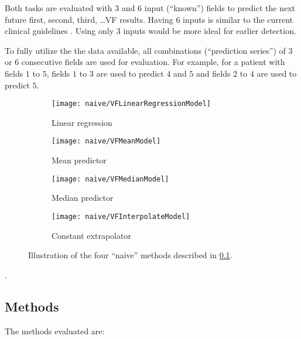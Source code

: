 Both tasks are evaluated with $3$ and $6$ input (``known'') fields to predict the next future first, second, third, \ldots \acl{VF} results. Having $6$ inputs is similar to the current clinical guidelines \cite{Chauhan2008}. Using only $3$ inputs would be more ideal for earlier detection. 

To fully utilize the the data available, all combinations (``prediction series'') of $3$ or $6$ consecutive fields are used for evaluation. For example, for a patient with fields $1$ to $5$, fields $1$ to $3$ are used to predict $4$ and $5$ and fields $2$ to $4$ are used to predict $5$. 

\begin{figure}[t]
	\centering
	\begin{subfigure}[b]{0.49\textwidth}
		\centering
		\texttt{[image: naive/VFLinearRegressionModel]}
		\caption{Linear regression}
	\end{subfigure}
	\hfill
	\begin{subfigure}[b]{0.49\textwidth}
		\centering
		\texttt{[image: naive/VFMeanModel]}
		\caption{Mean predictor}
	\end{subfigure}
	\hfill
	\begin{subfigure}[b]{0.49\textwidth}
		\centering
		\texttt{[image: naive/VFMedianModel]}
		\caption{Median predictor}
	\end{subfigure}
	\hfill
	\begin{subfigure}[b]{0.49\textwidth}
		\centering
		\texttt{[image: naive/VFInterpolateModel]}
		\caption{Constant extrapolator}
	\end{subfigure}
	\caption{Illustration of the four ``naive'' methods described in \cref{naivemethods}.}
\end{figure}. 


\subsection{Methods} \label{naivemethods}

The methods evaluated are:

